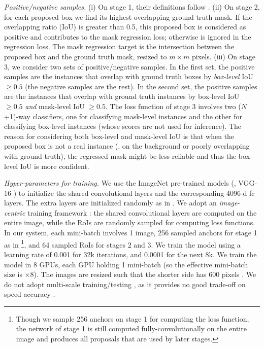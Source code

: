 \documentclass[10pt,twocolumn,letterpaper]{article}
\begin{document}
\vspace{.5em}
\noindent\emph{Positive/negative samples.} (i) On stage 1, their definitions follow \cite{Ren2015}. (ii) On stage 2, for each proposed box we find its highest overlapping ground truth mask. If the overlapping ratio (IoU) is greater than 0.5, this proposed box is considered as positive and contributes to the mask regression loss; otherwise is ignored in the regression loss. The mask regression target is the intersection between the proposed box and the ground truth mask, resized to $m\times m$ pixels. (iii) On stage 3, we consider two sets of positive/negative samples. In the first set, the positive samples are the instances that overlap with ground truth boxes by \emph{box-level} IoU $\geq 0.5$ (the negative samples are the rest). In the second set, the positive samples are the instances that overlap with ground truth instances by box-level IoU $\geq 0.5$ \emph{and} mask-level IoU $\geq 0.5$.
The loss function of stage 3 involves two ($N$+1)-way classifiers, one for classifying mask-level instances and the other for classifying box-level instances (whose scores are not used for inference). 
The reason for considering both box-level and mask-level IoU is that when the proposed box is not a real instance (\eg, on the background or poorly overlapping with ground truth), the regressed mask might be less reliable and thus the box-level IoU is more confident.

\vspace{.5em}
\noindent\emph{Hyper-parameters for training.}
We use the ImageNet pre-trained models (\eg, VGG-16 \cite{Simonyan2015}) to initialize the shared convolutional layers and the corresponding 4096-d fc layers. The extra layers are initialized randomly as in \cite{He2015}. We adopt an \emph{image-centric} training framework \cite{Girshick2015}: the shared convolutional layers are computed on the entire image, while the RoIs are randomly sampled for computing loss functions. In our system, each mini-batch involves 1 image, 256 sampled anchors for stage 1 as in \cite{Ren2015}\footnote{Though we sample 256 anchors on stage 1 for computing the loss function, the network of stage 1 is still computed fully-convolutionally on the entire image and produces all proposals that are used by later stages.}, and 64 sampled RoIs for stages 2 and 3. We train the model using a learning rate of 0.001 for 32k iterations, and 0.0001 for the next 8k. We train the model in 8 GPUs, each GPU holding 1 mini-batch (so the effective mini-batch size is $\times$8). The images are resized such that the shorter side has 600 pixels \cite{Girshick2015}. We do not adopt multi-scale training/testing \cite{He2014,Girshick2015}, as it provides no good trade-off on speed \vs accuracy \cite{Girshick2015}.
\end{document}
